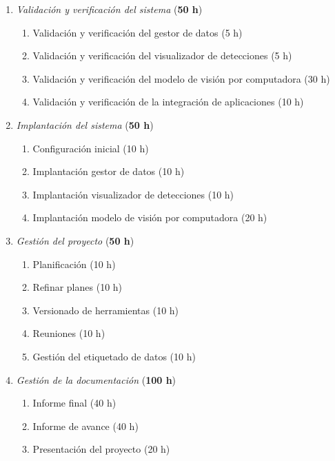 \documentclass[
11pt, %
]{charter}
\begin{document}
\begin{enumerate}
  \item \textit{Validación y verificación del sistema} (\textbf{50 h})
        \begin{enumerate}
          \item Validación y verificación del gestor de datos (5 h)
          \item Validación y verificación del visualizador de detecciones (5 h)
          \item Validación y verificación del modelo de visión por computadora (30 h)
          \item Validación y verificación de la integración de aplicaciones (10 h)
        \end{enumerate}

  \item \textit{Implantación del sistema} (\textbf{50 h})
        \begin{enumerate}
          \item Configuración inicial (10 h)
          \item Implantación gestor de datos (10 h)
          \item Implantación visualizador de detecciones (10 h)
          \item Implantación modelo de visión por computadora (20 h)
        \end{enumerate}

  \item \textit{Gestión del proyecto} (\textbf{50 h})
        \begin{enumerate}
          \item Planificación (10 h)
          \item Refinar planes (10 h)
          \item Versionado de herramientas (10 h)
          \item Reuniones (10 h)
          \item Gestión del etiquetado de datos (10 h)
        \end{enumerate}

  \item \textit{Gestión de la documentación} (\textbf{100 h})
        \begin{enumerate}
          \item Informe final (40 h)
          \item Informe de avance (40 h)
          \item Presentación del proyecto (20 h)
        \end{enumerate}

\end{enumerate}
\end{document}
